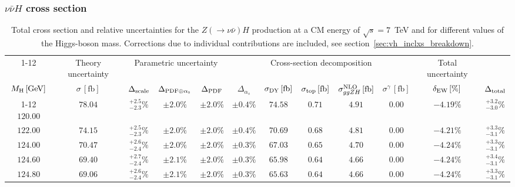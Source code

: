 \begin{landscape}
\FloatBarrier
\subsubsection{\texorpdfstring{$\nu \bar{\nu} H$}{nu nu-bar H} cross section}

\begin{table}[ht!]
\caption{Total cross section and relative uncertainties for the $Z ( \rightarrow 
\nu \bar{\nu}) H$ production at a CM energy of  $\sqrt{s}=7$~TeV and for different values of the Higgs-boson mass. Corrections due to individual contributions are included, see section~\ref{sec:vh_inclxs_breakdown}.}
\label{tab:zh_nu_xs_7tev}
\centering
\scriptsize
{\renewcommand{\arraystretch}{1.4}
\begin{tabular}{| cc | c | ccc | ccccc | c |}
\cline{1-12}
\multicolumn{2}{|c|}{\(\sqrt{s} = 7\,\mathrm{TeV}\)} &
\multicolumn{1}{|c|}{Theory uncertainty} &
\multicolumn{3}{|c|}{Parametric uncertainty} &
\multicolumn{5}{|c|}{Cross-section decomposition} &
\multicolumn{1}{c|}{Total uncertainty} \\
\(M_\mathrm{H}\,[\mathrm{GeV}]\) & \(\sigma\,[\mathrm{fb}]\) &
\(\Delta_{\rm scale}\) &
\(\Delta_{\rm PDF\oplus\alpha_s}\) &
{\color{black!55}\(\Delta_{\rm PDF}\)} & {\color{black!55}\(\Delta_{\alpha_s}\)} &
\(\sigma_{\rm DY}\,[\mathrm{fb}]\) & \(\sigma_{\rm top}\,[\mathrm{fb}]\) & \(\sigma^{\rm NLO}_{ggZH}\,[\mathrm{fb}]\) & \(\sigma^\gamma\,[\mathrm{fb}]\) & \(\delta_{\rm EW}\,[\%]\) &
\(\Delta_{\rm total}\)
\\
\cline{1-12}
$120.00$ & $78.04$ & $^{+2.5}_{-2.3}\%$ & $\pm 2.0\%$ & {\color{black!55}$\pm 2.0\%$} & {\color{black!55}$\pm 0.4\%$} & $74.58$ & $0.71$ & $4.91$ & $0.00$ & $-4.19\%$ & $^{+3.2}_{-3.0}\%$ \\
$122.00$ & $74.15$ & $^{+2.5}_{-2.3}\%$ & $\pm 2.0\%$ & {\color{black!55}$\pm 2.0\%$} & {\color{black!55}$\pm 0.4\%$} & $70.69$ & $0.68$ & $4.81$ & $0.00$ & $-4.21\%$ & $^{+3.3}_{-3.1}\%$ \\
$124.00$ & $70.47$ & $^{+2.6}_{-2.4}\%$ & $\pm 2.0\%$ & {\color{black!55}$\pm 2.0\%$} & {\color{black!55}$\pm 0.3\%$} & $67.03$ & $0.65$ & $4.70$ & $0.00$ & $-4.24\%$ & $^{+3.3}_{-3.1}\%$ \\
$124.60$ & $69.40$ & $^{+2.7}_{-2.4}\%$ & $\pm 2.1\%$ & {\color{black!55}$\pm 2.0\%$} & {\color{black!55}$\pm 0.3\%$} & $65.98$ & $0.64$ & $4.66$ & $0.00$ & $-4.24\%$ & $^{+3.4}_{-3.1}\%$ \\
$124.80$ & $69.06$ & $^{+2.6}_{-2.4}\%$ & $\pm 2.1\%$ & {\color{black!55}$\pm 2.0\%$} & {\color{black!55}$\pm 0.3\%$} & $65.63$ & $0.64$ & $4.66$ & $0.00$ & $-4.24\%$ & $^{+3.3}_{-3.1}\%$ \\

\end{tabular}}
\end{table}
\end{landscape}
